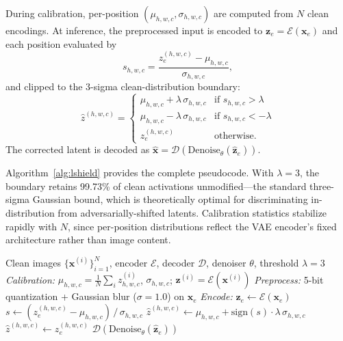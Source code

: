 \documentclass[conference]{IEEEtran}
\begin{document}
\label{sec:algorithm}
During calibration, per-position $(\mu_{h,w,c},\sigma_{h,w,c})$ are computed from
$N$ clean encodings. At inference, the preprocessed input is encoded to
$\mathbf{z}_e\!=\!\mathcal{E}(\mathbf{x}_e)$ and each position evaluated by
\begin{equation}
  s_{h,w,c} = \frac{z_e^{(h,w,c)} - \mu_{h,w,c}}{\sigma_{h,w,c}},
\end{equation}
and clipped to the 3-sigma clean-distribution boundary:
\begin{equation}
  \hat{z}^{(h,w,c)} =
  \begin{cases}
    \mu_{h,w,c} + \lambda\,\sigma_{h,w,c} & \text{if } s_{h,w,c} > \lambda \\
    \mu_{h,w,c} - \lambda\,\sigma_{h,w,c} & \text{if } s_{h,w,c} < -\lambda \\
    z_e^{(h,w,c)} & \text{otherwise.}
  \end{cases}
\end{equation}
The corrected latent is decoded as
$\hat{\mathbf{x}}\!=\!\mathcal{D}(\mathrm{Denoise}_\theta(\hat{\mathbf{z}}_e))$.

Algorithm~\ref{alg:lshield} provides the complete pseudocode.
With $\lambda\!=\!3$, the boundary retains 99.73\% of clean activations
unmodified---the standard three-sigma Gaussian bound, which is theoretically
optimal for discriminating in-distribution from adversarially-shifted latents.
Calibration statistics stabilize rapidly with $N$, since per-position
distributions reflect the VAE encoder's fixed architecture rather than image
content.

\begin{algorithm}[t]
\caption{L-SHIELD Defense}
\label{alg:lshield}
{\small
\begin{algorithmic}[1]
\REQUIRE Clean images $\{\mathbf{x}^{(i)}\}_{i=1}^{N}$, encoder $\mathcal{E}$,
  decoder $\mathcal{D}$, denoiser $\theta$, threshold $\lambda{=}3$
\STATE \textit{Calibration:} $\mu_{h,w,c}\!=\!\frac{1}{N}\sum_i z^{(i)}_{h,w,c}$,
  $\sigma_{h,w,c}$; $\mathbf{z}^{(i)}\!=\!\mathcal{E}(\mathbf{x}^{(i)})$
\STATE \textit{Preprocess:} 5-bit quantization + Gaussian blur ($\sigma{=}1.0$) on $\mathbf{x}_e$
\STATE \textit{Encode:} $\mathbf{z}_e \leftarrow \mathcal{E}(\mathbf{x}_e)$
  \STATE $s \leftarrow (z_e^{(h,w,c)} - \mu_{h,w,c})\,/\,\sigma_{h,w,c}$
    \STATE $\hat{z}^{(h,w,c)} \leftarrow \mu_{h,w,c} + \mathrm{sign}(s)\cdot\lambda\,\sigma_{h,w,c}$
  \ELSE
    \STATE $\hat{z}^{(h,w,c)} \leftarrow z_e^{(h,w,c)}$
  \ENDIF
\ENDFOR
\RETURN $\mathcal{D}\!\left(\mathrm{Denoise}_{\theta}(\hat{\mathbf{z}}_e)\right)$
\end{algorithmic}
}
\end{algorithm}
\end{document}
